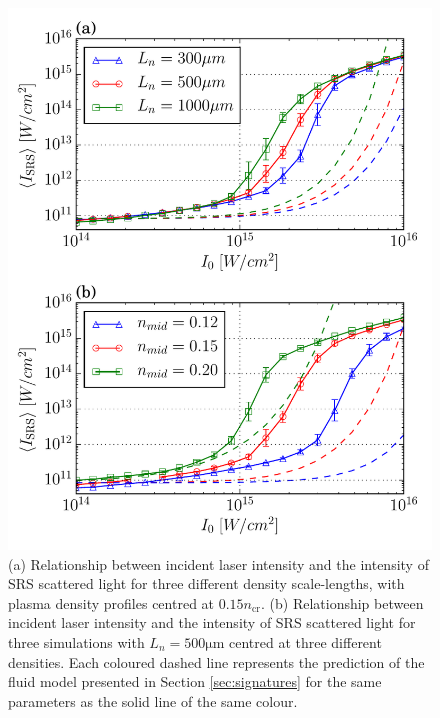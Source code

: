 \begin{figure}[!ht]
     \centering
    \includegraphics[width=0.8\columnwidth]{Chapters/C4_iSRS/fig6_6a_6b.pdf}
    \caption{
    (a)  Relationship between incident laser intensity and the intensity of SRS scattered light for three different density scale-lengths, with plasma density profiles centred at $0.15n_\mathrm{cr}$.
    (b) Relationship between incident laser intensity and the intensity of SRS scattered light for three simulations with $L_n=500\si{\micro\metre}$ centred at three different densities.
    Each coloured dashed line represents the prediction of the fluid model presented in Section \ref{sec:signatures} for the same parameters as the solid line of the same colour.
    }
    \label{fig:paramScan}
\end{figure}

